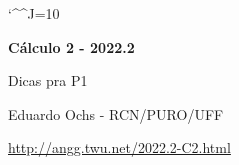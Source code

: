 \documentclass[oneside,12pt]{article}
\begin{document}
\catcode`\^^J=10
\pu
\def\pictgridstyle{\color{GrayPale}\linethickness{0.3pt}}
\def\pictaxesstyle{\linethickness{0.5pt}}
\def\pictnaxesstyle{\color{GrayPale}\linethickness{0.5pt}}
\celllower=2.5pt


\def\u#1{\par{\footnotesize \url{#1}}}

\def\drafturl{http://angg.twu.net/LATEX/2022-2-C2.pdf}
\def\drafturl{http://angg.twu.net/2022.2-C2.html}
\def\draftfooter{\tiny \href{\drafturl}{\jobname{}} \ColorBrown{\shorttoday{} \hours}}



%

\thispagestyle{empty}

\begin{center}

\vspace*{1.2cm}

{\bf \Large Cálculo 2 - 2022.2}

\bsk

Dicas pra P1

\bsk

Eduardo Ochs - RCN/PURO/UFF

\url{http://angg.twu.net/2022.2-C2.html}

\end{center}

\newpage

\end{document}

